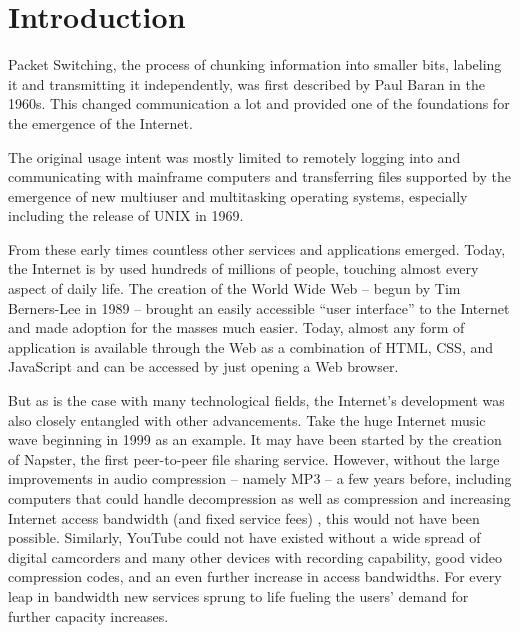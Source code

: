 \chapter{Introduction}
\label{chap:intro}




Packet Switching, the process of chunking information into smaller bits, labeling it and transmitting it independently, was first described by Paul Baran in the 1960s\cite{baran1964distributed}. This changed communication a lot and provided one of the foundations for the emergence of the Internet. 

The original usage intent was mostly limited to remotely logging into and communicating with mainframe computers and transferring files supported by the emergence of new multiuser and multitasking operating systems, especially including the release of UNIX in 1969.

From these early times countless other services and applications emerged. Today, the Internet is by used hundreds of millions of people, touching almost every aspect of daily life. The creation of the World Wide Web -- begun by Tim Berners-Lee in 1989 -- brought an easily accessible ``user interface'' to the Internet and made adoption for the masses much easier. Today, almost any form of application is available through the Web as a combination of \gls{HTML}, \gls{CSS}, and JavaScript and can be accessed by just opening a Web browser.

But as is the case with many technological fields, the Internet's development was also closely entangled with other advancements. Take the huge Internet music wave beginning in 1999 as an example. It may have been started by the creation of Napster, the first peer-to-peer file sharing service. However, without the large improvements in audio compression -- namely MP3 -- a few years before, including computers that could handle decompression as well as compression and increasing Internet access bandwidth (and fixed service fees) , this would not have been possible. Similarly, YouTube could not have existed without a wide spread of digital camcorders and many other devices with recording capability, good video compression codes, and an even further increase in access bandwidths.
 For every leap in bandwidth new services sprung to life fueling the users' demand for further capacity increases. 

